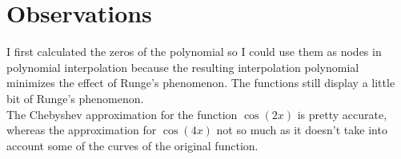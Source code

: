 \documentclass{article}
\begin{document}
\section{Observations}
I first calculated the zeros of the polynomial so I could use them as nodes in polynomial interpolation because the resulting interpolation polynomial minimizes the effect of Runge's phenomenon. The functions still display a little bit of Runge's phenomenon. \\

The Chebyshev approximation for the function $\cos(2x)$ is pretty accurate, whereas the approximation for $\cos(4x)$ not so much as it doesn't take into account some of the curves of the original function.
\end{document}
